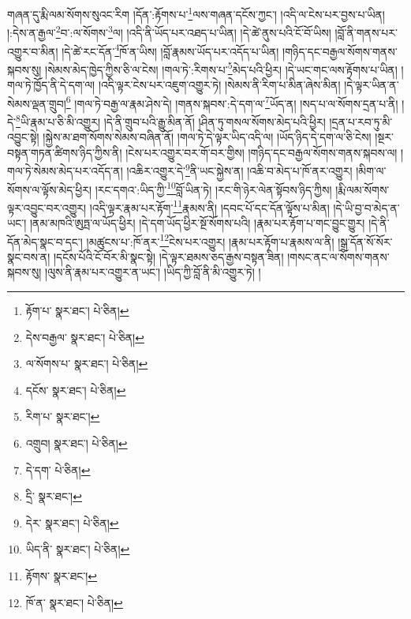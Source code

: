 གཞན་དུ་རྨི་ལམ་སོགས་སུའང་རིག །དོན་:རྟོགས་པ་\footnote{རྟོག་པ་  སྣར་ཐང་།  པེ་ཅིན། }ལས་གཞན་དངོས་ཀྱང་། །འདི་ལ་ངེས་པར་བྱས་པ་ཡིན། །:དེས་ན་རྒྱལ་\footnote{དེས་བརྒྱལ་  སྣར་ཐང་།  པེ་ཅིན། }བ་:ལ་སོགས་\footnote{ལ་སོགས་པ་  སྣར་ཐང་།  པེ་ཅིན། }ལ། །འདི་ནི་ཡོད་པར་འཐད་པ་ཡིན། །དེ་ཚེ་ནུས་པའི་ངོ་བོ་ཡིས། །བློ་ནི་གནས་པར་འགྱུར་བ་མིན། །དེ་ཚེ་རང་དོན་\footnote{དངོས་  སྣར་ཐང་།  པེ་ཅིན། }ཁོ་ན་ཡིས། །བློ་རྣམས་ཡོད་པར་འདོད་པ་ཡིན། །གཉིད་དང་བརྒྱལ་སོགས་གནས་སྐབས་སུ། །སེམས་མེད་ཁྱེད་ཀྱིས་ཅི་ལ་ངེས། །གལ་ཏེ་:རིགས་པ་\footnote{རིག་པ་  སྣར་ཐང་། }མེད་པའི་ཕྱིར། །དེ་ཡང་གང་ལས་རྟོགས་པ་ཡིན། །གལ་ཏེ་ཁྱོད་ནི་དེ་དག་ལ། །འདི་ལྟར་ངེས་པར་འཇུག་འགྱུར་ཏེ། །སེམས་ནི་རིག་པ་མིན་ཞེས་མིན། །དེ་ལྟར་ཡིན་ན་སེམས་ལྡན་གྲུབ།\footnote{འགྲུབ།  སྣར་ཐང་།  པེ་ཅིན། } །གལ་ཏེ་བརྒྱ་ལ་རྣམ་ཤེས་དེ། །གནས་སྐབས་:དེ་དག་ལ་\footnote{དེ་དག་  པེ་ཅིན། }ཡོད་ན། །སད་པ་ལ་སོགས་དྲན་པ་ནི། །དེ་\footnote{དྲི་  སྣར་ཐང་། }ཡི་རྣམ་པ་ཅི་མི་འགྱུར། །དེ་ནི་གྲུབ་པའི་རྒྱུ་མིན་ནོ། །ཤིན་ཏུ་གསལ་སོགས་མེད་པའི་ཕྱིར། །དྲན་པ་རབ་ཏུ་མི་འབྱུང་སྟེ། །སྐྱེས་མ་ཐག་སོགས་སེམས་བཞིན་ནོ། །གལ་ཏེ་དེ་ལྟར་ཡིད་འདི་ལ། །ཡོད་ཉིད་དེ་དག་ལ་ཅི་ངེས། །སྔར་བསྟན་གཏན་ཚིགས་ཉིད་ཀྱིས་ནི། །ངེས་པར་འགྱུར་བར་གོ་བར་གྱིས། །གཉིད་དང་བརྒྱལ་སོགས་གནས་སྐབས་ལ། །གལ་ཏེ་སེམས་མེད་པར་འདོད་ན། །འཆིར་འགྱུར་དེ་\footnote{དེར་  སྣར་ཐང་།  པེ་ཅིན། }ནི་ཡང་སྐྱེས་ན། །འཆི་བ་མེད་པ་ཁོ་ནར་འགྱུར། །མིག་ལ་སོགས་ལ་ལྟོས་མེད་ཕྱིར། །རང་དགའ་:ཡིད་ཀྱི་\footnote{ཡིད་ནི་  སྣར་ཐང་།  པེ་ཅིན། }བློ་ཡིན་ཏེ། །རང་གི་ཉེར་ལེན་སྟོབས་ཉིད་ཀྱིས། །རྨི་ལམ་སོགས་ལྟར་འབྱུང་བར་འགྱུར། །འདི་ལྟར་རྣམ་པར་རྟོག་\footnote{རྟོགས་  སྣར་ཐང་། }རྣམས་ནི། །དབང་པོ་དང་དོན་ལྟོས་པ་མིན། །དེ་ཡི་བྱ་བ་མེད་ན་ཡང་། །ནམ་མཁའི་ཨུཏྤ་ལ་ཡོད་ཕྱིར། །དེ་དག་ཡོད་ཕྱིར་སྔོ་སོགས་པའི། །རྣམ་པར་རྟོག་པ་གང་བྱུང་གྱུར། །དེ་ནི་དོན་མེད་སྣང་བ་དང་། །མཚུངས་པ་:ཁོ་ནར་\footnote{ཁོ་ན་  སྣར་ཐང་།  པེ་ཅིན། }ངེས་པར་འགྱུར། །རྣམ་པར་རྟོག་པ་རྣམས་ལ་ནི། །སྒྲ་དོན་སོ་སོར་སྣང་བས་ན། །དངོས་པོའི་ངོ་བོར་མི་སྣང་སྟེ། །དེ་ལྟར་ཐམས་ཅད་རྒྱས་བསྟན་ཟིན། །གསང་ནང་ལ་སོགས་གནས་སྐབས་སུ། །ལུས་ནི་རྣམ་པར་འགྱུར་ན་ཡང་། །ཡིད་ཀྱི་བློ་ནི་མི་འགྱུར་ཏེ། །
